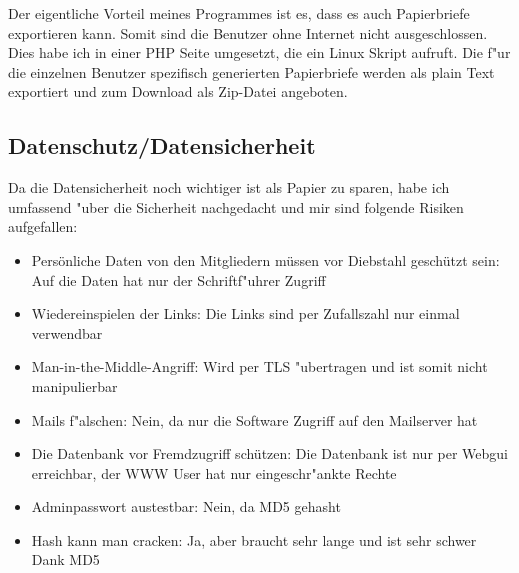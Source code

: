 \documentclass[12pt,twoside]{article}  %
\begin{document}
  Der eigentliche Vorteil meines Programmes ist es, dass es auch Papierbriefe exportieren kann. Somit sind die Benutzer ohne Internet nicht ausgeschlossen. 
  Dies habe ich in einer PHP Seite umgesetzt, die ein Linux Skript aufruft. Die f"ur die einzelnen Benutzer spezifisch generierten Papierbriefe werden als 
  plain Text exportiert und zum Download als Zip-Datei angeboten.
 
  \subsection{Datenschutz/Datensicherheit}
Da die Datensicherheit noch wichtiger ist als Papier zu sparen, habe ich umfassend "uber die Sicherheit nachgedacht und mir sind folgende Risiken aufgefallen:
          \begin{itemize}
	  \item Persönliche Daten von den Mitgliedern müssen vor Diebstahl geschützt sein: Auf die Daten hat nur der Schriftf"uhrer Zugriff \\
          \item Wiedereinspielen der Links: Die Links sind per Zufallszahl nur einmal verwendbar \\
          \item Man-in-the-Middle-Angriff:  Wird per TLS "ubertragen und ist somit nicht manipulierbar \\
          \item Mails f"alschen:  Nein, da nur die Software Zugriff auf den Mailserver hat \\
	  \item Die Datenbank vor Fremdzugriff schützen: Die Datenbank ist nur per Webgui erreichbar, der WWW User hat nur eingeschr"ankte Rechte \\
	  \item Adminpasswort austestbar: Nein, da MD5 gehasht \\
	  \item Hash kann man cracken: Ja, aber braucht sehr lange und ist sehr schwer Dank MD5 \\
          \end{itemize}

\end{document}
